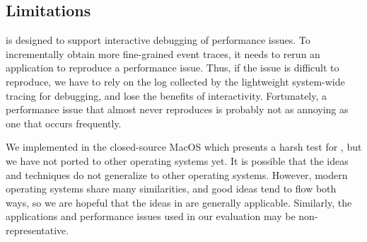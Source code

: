 \subsection{Limitations}

\xxx is designed to support interactive debugging of performance issues.
To incrementally obtain more fine-grained event traces, it needs to rerun
an application to reproduce a performance issue.  Thus, if the issue is
difficult to reproduce, we have to rely on the log collected by the
lightweight system-wide tracing for debugging, and lose the benefits of
interactivity.  Fortunately, a performance issue that almost never
reproduces is probably not as annoying as one that occurs frequently.

We implemented \xxx in the closed-source MacOS which presents a harsh test
for \xxx, but we have not ported \xxx to other operating systems yet.  It
is possible that the ideas and techniques do not generalize to other
operating systems.  However, modern operating systems share many
similarities, and good ideas tend to flow both ways, so we are hopeful
that the ideas in \xxx are generally applicable.  Similarly, the
applications and performance issues used in our evaluation may be
non-representative.
